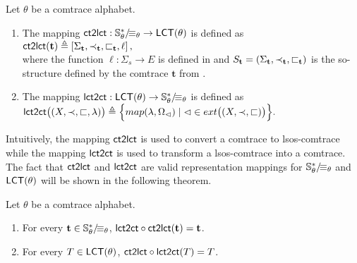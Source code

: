 \documentclass{llncs}
\begin{document}
\begin{definition} Let $\theta$ be a comtrace alphabet. 
\begin{enumerate}
 \item The mapping  $\mathsf{ct2lct}:{\mathbb{S}_\theta^*}/\!{\equiv_{\theta}} \rightarrow \mathsf{LCT}(\theta)$ is defined as\smallskip\\
 \mbox{\hspace{4cm}}$\mathsf{ct2lct}(\mathbf{t}) \triangleq \left[ \Sigma_{\mathbf{t}},\prec_{\mathbf{t}},\sqsubset_{\mathbf{t}},\ell \right],$\smallskip\\
where the function $\ell:\Sigma_s\rightarrow E$ is defined in  and $S_{\mathbf{t}}=(\Sigma_{\mathbf{t}},\prec_{\mathbf{t}},\sqsubset_{\mathbf{t}})$ is the so-structure defined by the comtrace $\mathbf{t}$ from . 
 \item The mapping  $\mathsf{lct2ct}:\mathsf{LCT}(\theta)\rightarrow {\mathbb{S}_\theta^*}/\!{\equiv_{\theta}}$ is defined as\smallskip\\
\mbox{\hspace{1.5cm}} $\mathsf{lct2ct}\bigl((X,\prec,\sqsubset,\lambda)\bigr) \triangleq \Bigl\{map(\lambda,\Omega_\lhd)\mid \lhd \in ext\bigl((X,\prec,\sqsubset)\bigr)\Bigr\}.$
 \EOD
\end{enumerate}
\label{def:repmaps}
\end{definition}

Intuitively, the mapping $\mathsf{ct2lct}$ is used to convert a comtrace to lsos-comtrace while the mapping $\mathsf{lct2ct}$ is used to transform a lsos-comtrace into a comtrace. The fact that $\mathsf{ct2lct}$ and $\mathsf{lct2ct}$ are valid representation mappings for ${\mathbb{S}_\theta^*}/\!{\equiv_{\theta}}$ and  $\mathsf{LCT}(\theta)$ will be  shown in the following theorem. 




\begin{theorem}  Let $\theta$ be a comtrace alphabet.
\begin{enumerate}
\item For every $\mathbf{t}\in {\mathbb{S}_\theta^*}/\!{\equiv_{\theta}}$, $\mathsf{lct2ct}\circ \mathsf{ct2lct}(\mathbf{t}) = \mathbf{t}$.
\item For every $T\in \mathsf{LCT}(\theta)$, $\mathsf{ct2lct}\circ \mathsf{lct2ct}(T) = T$.
\end{enumerate}
\label{theo:rep}
\end{theorem}
\end{document}
